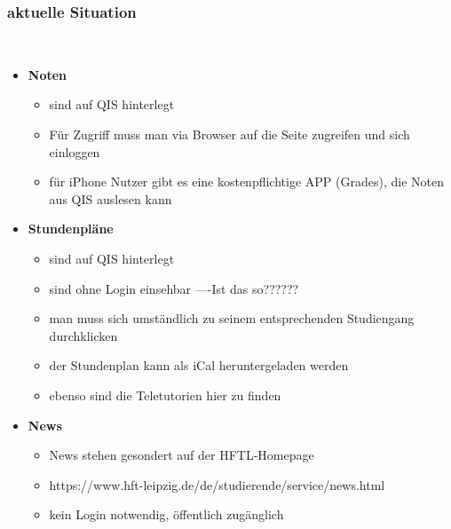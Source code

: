 \subsubsection{\textbf{aktuelle Situation}}\
\\
   \begin{itemize}
      \item \textbf{Noten}
      \begin{itemize}
         \item sind auf QIS hinterlegt
         \item Für Zugriff muss man via Browser auf die Seite zugreifen und sich einloggen
         \item für iPhone Nutzer gibt es eine kostenpflichtige APP (Grades), die Noten aus QIS auslesen kann
      \end{itemize}
      \item \textbf{Stundenpläne}
      \begin{itemize}
      	\item sind auf QIS hinterlegt
      	\item sind ohne Login einsehbar ----Ist das so??????
      	\item man muss sich umständlich zu seinem entsprechenden Studiengang durchklicken
      	\item der Stundenplan kann als iCal heruntergeladen werden
      	\item ebenso sind die Teletutorien hier zu finden
      \end{itemize}
      \item \textbf{News}
      \begin{itemize}
      	\item News stehen gesondert auf der HFTL-Homepage
      	\item https://www.hft-leipzig.de/de/studierende/service/news.html
      	\item kein Login notwendig, öffentlich zugänglich
      \end{itemize}
   \end{itemize}


